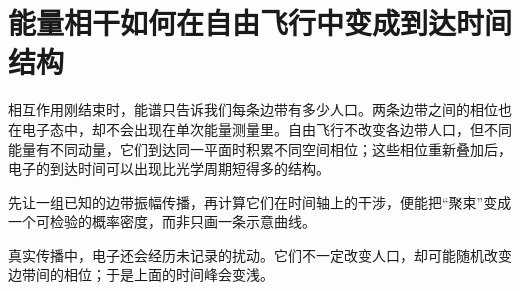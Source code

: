 \chapter{能量相干如何在自由飞行中变成到达时间结构}
\label{chap:feqo-propagation}

相互作用刚结束时，能谱只告诉我们每条边带有多少人口。两条边带之间的相位也在电子态中，却不会出现在单次能量测量里。自由飞行不改变各边带人口，但不同能量有不同动量，它们到达同一平面时积累不同空间相位；这些相位重新叠加后，电子的到达时间可以出现比光学周期短得多的结构。



先让一组已知的边带振幅传播，再计算它们在时间轴上的干涉，便能把“聚束”变成一个可检验的概率密度，而非只画一条示意曲线。



真实传播中，电子还会经历未记录的扰动。它们不一定改变人口，却可能随机改变边带间的相位；于是上面的时间峰会变浅。



